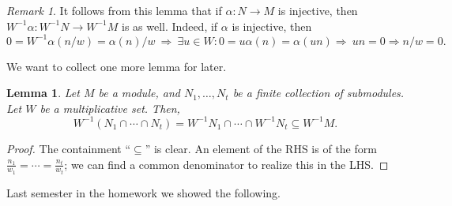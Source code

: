 \documentclass{amsart}[12pt]
\numberwithin{equation}{section}
\theoremstyle{plain} %
\newtheorem{lemma}[equation]{Lemma}
\theoremstyle{definition}
\theoremstyle{remark}
\newtheorem{remark}[equation]{Remark}
\begin{document}
\begin{remark}
	It follows from this lemma that if $\alpha:N\to M$ is injective, then $W^{-1}\alpha: W^{-1}N\to W^{-1}M$ is as well. Indeed, if $\alpha$ is injective, then
	\[ 0=W^{-1}\alpha(n/w)=\alpha(n)/w \ \Rightarrow \ \exists u\in W : 0=u\alpha(n)=\alpha(un) \Rightarrow \ un=0 \Rightarrow n/w=0.\]
\end{remark}





We want to collect one more lemma for later.

\begin{lemma} Let $M$ be a module, and $N_1,\dots,N_t$ be a finite collection of submodules. Let $W$ be a multiplicative set. Then,
	\[ W^{-1} (N_1 \cap \cdots \cap N_t) = W^{-1} N_1 \cap \cdots \cap W^{-1} N_t \subseteq W^{-1}M.\]
\end{lemma}
\begin{proof}
	The containment ``$\subseteq$'' is clear. An element of the RHS is of the form $\frac{n_1}{w_1}= \cdots = \frac{n_t}{w_t}$; we can find a common denominator to realize this in the LHS.
\end{proof}

Last semester in the homework we showed the following.
\end{document}
